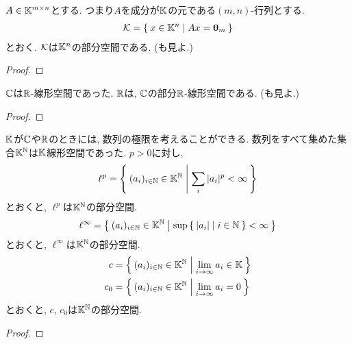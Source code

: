 \begin{example}
  \label{subsp:example:fiber}
  $A\in \mathbb{K}^{m\times n}$とする.
  つまり$A$を成分が$\mathbb{K}$の元である$(m,n)$-行列とする.
  \begin{align*}
    \mathcal{K}=\Set{x\in \mathbb{K}^n|Ax=\boldsymbol{0}_m}
  \end{align*}
  とおく. $\mathcal{K}$は$\mathbb{K}^n$の部分空間である.
  (も見よ.)
\end{example}
\begin{proof}\end{proof}

\begin{example}
  \label{subsp:example:cc}
  $\mathbb{C}$は$\mathbb{R}$-線形空間であった.
  $\mathbb{R}$は, $\mathbb{C}$の部分$\mathbb{R}$-線形空間である.
  (も見よ.)
\end{example}
\begin{proof}\end{proof}


\begin{example}
  $\mathbb{K}$が$\mathbb{C}$や$\mathbb{R}$のときには,
  数列の極限を考えることができる.  
  数列をすべて集めた集合$\mathbb{K}^{\mathbb{N}}$は$\mathbb{K}$線形空間であった.
  $p>0$に対し,
  \begin{align*}
    \ell^p=\Set{(a_i)_{i\in\mathbb{N}}\in \mathbb{K}^{\mathbb{N}}|\sum_i |a_i|^p < \infty}
  \end{align*}
  とおくと, $\ell^p$は$\mathbb{K}^{\mathbb{N}}$の部分空間.
  \begin{align*}
    \ell^\infty=\Set{(a_i)_{i\in\mathbb{N}}\in \mathbb{K}^{\mathbb{N}}|\sup \Set{\left|a_i\right||i\in \mathbb{N}} < \infty}
  \end{align*}
  とおくと, $\ell^\infty$は$\mathbb{K}^{\mathbb{N}}$の部分空間.
  \begin{align*}
    c&=\Set{(a_i)_{i\in\mathbb{N}} \in \mathbb{K}^{\mathbb{N}}| \lim_{i\to\infty} a_i \in\mathbb{K}}\\
    c_0&=\Set{(a_i)_{i\in\mathbb{N}} \in \mathbb{K}^{\mathbb{N}}| \lim_{i\to\infty} a_i =0}\\
  \end{align*}
  とおくと, $c$, $c_0$は$\mathbb{K}^{\mathbb{N}}$の部分空間.
\end{example}
\begin{proof}\end{proof}

